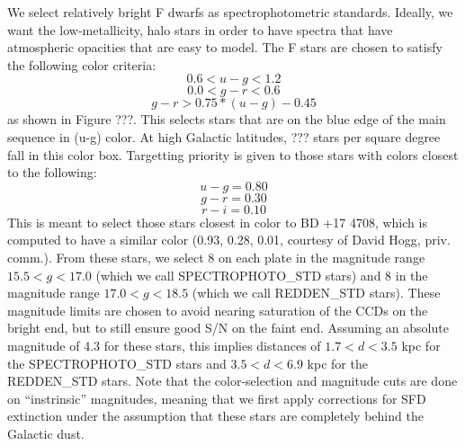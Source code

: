 \documentclass[12pt,preprint]{aastex}
\begin{document}

We select relatively bright F dwarfs as spectrophotometric 
standards.  Ideally, we want the low-metallicity, halo stars in order 
to have spectra that have atmospheric opacities that are easy to model.
The F stars are chosen to satisfy the following color criteria:
$$ 0.6 < u-g < 1.2 $$
$$ 0.0 < g-r < 0.6 $$
$$ g-r > 0.75 * (u-g) - 0.45 $$
as shown in Figure ???.
This selects stars that are on the blue edge of the main
sequence in (u-g) color.  At high Galactic latitudes,
??? stars per square degree fall in this color box.
Targetting priority is given to
those stars with colors closest to the following:
$$ u-g = 0.80 $$
$$ g-r = 0.30 $$
$$ r-i = 0.10 $$
This is meant to select those stars closest in color to BD +17 4708,
which is computed to have a similar color (0.93, 0.28, 0.01, courtesy
of David Hogg, priv. comm.).
From these stars, we select 8 on each plate in the magnitude
range $15.5 < g < 17.0$ (which we call SPECTROPHOTO\_STD stars)
and 8 in the magnitude range $17.0 < g < 18.5$ (which we call
REDDEN\_STD stars).
These magnitude limits are chosen to avoid nearing saturation
of the CCDs on the bright end, but to still ensure good S/N
on the faint end.
Assuming an absolute magnitude of 4.3 for these stars, this
implies distances of $1.7 < d < 3.5$ kpc for the SPECTROPHOTO\_STD
stars and $3.5 < d < 6.9$ kpc for the REDDEN\_STD stars.
Note that the color-selection and magnitude cuts are done on
``instrinsic'' magnitudes, meaning that we first apply corrections
for SFD extinction under the assumption that these stars are
completely behind the Galactic dust.
\end{document}
